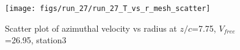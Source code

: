 \begin{figure}[H]
\centering
\texttt{[image: figs/run\_27/run\_27\_T\_vs\_r\_mesh\_scatter]}
\caption{Scatter plot of azimuthal velocity vs radius at $z/c$=7.75, $V_{free}$=26.95, station3}
\label{fig:run_27_T_vs_r_mesh_scatter}
\end{figure}


